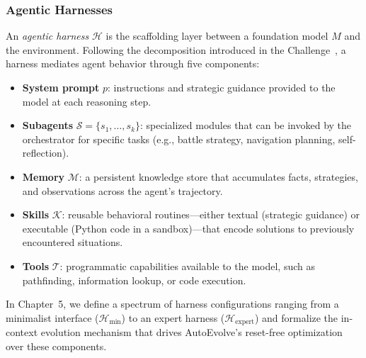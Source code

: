 \subsubsection{Agentic Harnesses}\label{sec:formal_harness}

An \emph{agentic harness} $\mathcal{H}$ is the scaffolding layer between a foundation model $M$ and the environment. Following the decomposition introduced in the \pokeagent{} Challenge~\citep{karten2025pokeagent}, a harness mediates agent behavior through five components:
\begin{itemize}[leftmargin=*]
    \item \textbf{System prompt} $p$: instructions and strategic guidance provided to the model at each reasoning step.
    \item \textbf{Subagents} $\mathcal{S} = \{s_1, \ldots, s_k\}$: specialized modules that can be invoked by the orchestrator for specific tasks (e.g., battle strategy, navigation planning, self-reflection).
    \item \textbf{Memory} $\mathcal{M}$: a persistent knowledge store that accumulates facts, strategies, and observations across the agent's trajectory.
    \item \textbf{Skills} $\mathcal{K}$: reusable behavioral routines---either textual (strategic guidance) or executable (Python code in a sandbox)---that encode solutions to previously encountered situations.
    \item \textbf{Tools} $\mathcal{T}$: programmatic capabilities available to the model, such as pathfinding, information lookup, or code execution.
\end{itemize}

In Chapter~5, we define a spectrum of harness configurations ranging from a minimalist interface ($\mathcal{H}_{\min}$) to an expert harness ($\mathcal{H}_{\text{expert}}$) and formalize the in-context evolution mechanism that drives AutoEvolve's reset-free optimization over these components.



